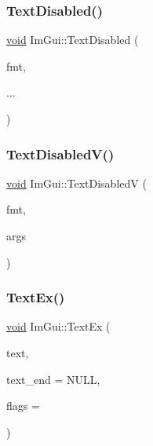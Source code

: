 \mbox{\label{namespaceImGui_aa96bf14c5fa288e106820aeb4ba7fcb6}} 
\subsubsection{\texorpdfstring{Text\+Disabled()}{TextDisabled()}}
{\footnotesize\ttfamily \hyperlink{imgui__impl__opengl3__loader_8h_ac668e7cffd9e2e9cfee428b9b2f34fa7}{void} Im\+Gui\+::\+Text\+Disabled (\begin{DoxyParamCaption}\item[{const char $\ast$}]{fmt,  }\item[{}]{... }\end{DoxyParamCaption})}

\mbox{\label{namespaceImGui_a5b128d4f12d7e33e95fb9cef7dce027e}} 
\subsubsection{\texorpdfstring{Text\+Disabled\+V()}{TextDisabledV()}}
{\footnotesize\ttfamily \hyperlink{imgui__impl__opengl3__loader_8h_ac668e7cffd9e2e9cfee428b9b2f34fa7}{void} Im\+Gui\+::\+Text\+DisabledV (\begin{DoxyParamCaption}\item[{const char $\ast$}]{fmt,  }\item[{va\+\_\+list}]{args }\end{DoxyParamCaption})}

\mbox{\label{namespaceImGui_aae6420fec03511fd478d9108f31e6b5f}} 
\subsubsection{\texorpdfstring{Text\+Ex()}{TextEx()}}
{\footnotesize\ttfamily \hyperlink{imgui__impl__opengl3__loader_8h_ac668e7cffd9e2e9cfee428b9b2f34fa7}{void} Im\+Gui\+::\+Text\+Ex (\begin{DoxyParamCaption}\item[{const char $\ast$}]{text,  }\item[{const char $\ast$}]{text\+\_\+end = {\ttfamily NULL},  }\item[{\hyperlink{imgui__internal_8h_af5a78082b7812985fff78923206b7488}{Im\+Gui\+Text\+Flags}}]{flags = {} }\end{DoxyParamCaption})}


